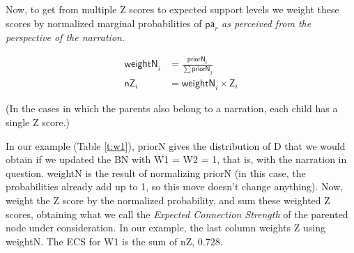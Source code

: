\documentclass[10pt,]{scrartcl}
\newcommand{\s}[1]{\mbox{\textsf{#1}}}
\begin{document}
 
 Now, to get from multiple \s{Z} scores to expected support levels we weight these scores by normalized  marginal probabilities of \(\mathsf{pa}_r\) \emph{as perceived from the perspective of the narration}. 
 
 \begin{align*}
    \mathsf{weightN}_i & = \frac{\mathsf{priorN}_i}{\sum \mathsf{priorN}_j}\\
    \mathsf{nZ}_{i} & = \mathsf{weightN}_i \times \mathsf{Z}_i
 \end{align*}
 
 
 \noindent (In  the cases in which the parents also belong to a narration,  each child has a single \s{Z} score.) 

 




 In our example (Table \ref{t:w1}), \textsf{priorN} gives the distribution of \textsf{D} that we would obtain if we updated the BN with \textsf{W1} = \textsf{W2} = 1, that is, with the narration in question.  \textsf{weightN} is the result of normalizing \textsf{priorN} (in this case, the probabilities already add up to 1, so this move doesn't change anything). Now, weight the Z score by the normalized probability, and sum these weighted Z scores, obtaining what we call the \emph{Expected Connection Strength} of the parented node under consideration.   In our example, the last column weights \textsf{Z} using  \textsf{weightN}. The \textsf{ECS} for \textsf{W1} is the sum of \textsf{nZ}, $0.728$.
\end{document}
